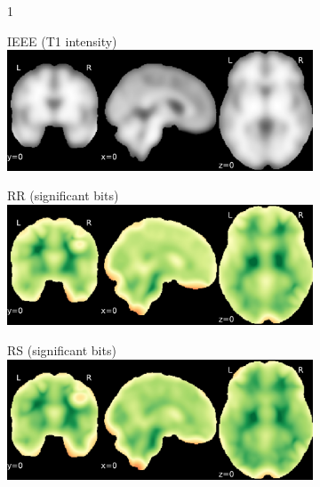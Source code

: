 \documentclass{article}
\begin{document}
\begin{landscape}
    \begin{figure}

        \vspace*{-2cm}
        \centering
        \begin{subfigure}[b][][c]{0.01\paperwidth} 1 \vspace*{-45pt} \end{subfigure}
        \begin{subfigure}[t]{0.2\paperheight}
            \centering
            IEEE (T1 intensity)
            \includegraphics[width=\textwidth]{figures/sig/15mm/ieee_ds001600_sub-1.pdf}
        \end{subfigure}
        \begin{subfigure}[t]{0.2\paperheight}
            \centering
            RR (significant bits)
            \includegraphics[width=\textwidth]{figures/sig/15mm/rr_ds001600_sub-1_sig.pdf}
        \end{subfigure}
        \begin{subfigure}[t]{0.2\paperheight}
            \centering
            RS (significant bits)
            \includegraphics[width=\textwidth]{figures/sig/15mm/rs_ds001600_sub-1_sig.pdf}

\end{subfigure}
\end{figure}
\end{landscape}
\end{document}

